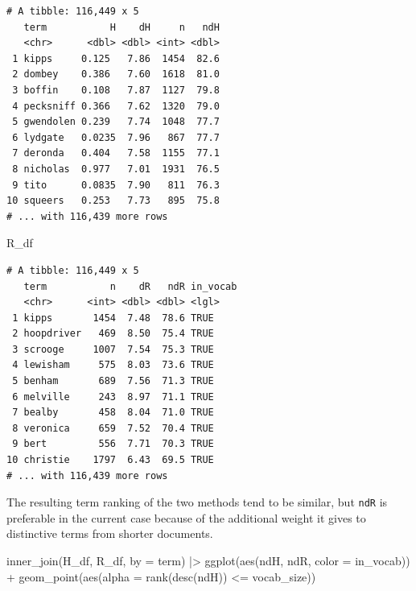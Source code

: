\documentclass[
]{article}
\newenvironment{Shaded}{\begin{snugshade}}{\end{snugshade}}
\newcommand{\AttributeTok}[1]{\textcolor[rgb]{0.40,0.45,0.13}{#1}}
\newcommand{\FunctionTok}[1]{\textcolor[rgb]{0.28,0.35,0.67}{#1}}
\newcommand{\NormalTok}[1]{\textcolor[rgb]{0.00,0.23,0.31}{#1}}
\newcommand{\SpecialCharTok}[1]{\textcolor[rgb]{0.37,0.37,0.37}{#1}}
\newcommand{\StringTok}[1]{\textcolor[rgb]{0.13,0.47,0.30}{#1}}
\begin{document}
\begin{verbatim}
# A tibble: 116,449 x 5
   term           H    dH     n   ndH
   <chr>      <dbl> <dbl> <int> <dbl>
 1 kipps     0.125   7.86  1454  82.6
 2 dombey    0.386   7.60  1618  81.0
 3 boffin    0.108   7.87  1127  79.8
 4 pecksniff 0.366   7.62  1320  79.0
 5 gwendolen 0.239   7.74  1048  77.7
 6 lydgate   0.0235  7.96   867  77.7
 7 deronda   0.404   7.58  1155  77.1
 8 nicholas  0.977   7.01  1931  76.5
 9 tito      0.0835  7.90   811  76.3
10 squeers   0.253   7.73   895  75.8
# ... with 116,439 more rows
\end{verbatim}

\begin{Shaded}
\begin{Highlighting}[]
\NormalTok{R\_df}
\end{Highlighting}
\end{Shaded}

\begin{verbatim}
# A tibble: 116,449 x 5
   term           n    dR   ndR in_vocab
   <chr>      <int> <dbl> <dbl> <lgl>   
 1 kipps       1454  7.48  78.6 TRUE    
 2 hoopdriver   469  8.50  75.4 TRUE    
 3 scrooge     1007  7.54  75.3 TRUE    
 4 lewisham     575  8.03  73.6 TRUE    
 5 benham       689  7.56  71.3 TRUE    
 6 melville     243  8.97  71.1 TRUE    
 7 bealby       458  8.04  71.0 TRUE    
 8 veronica     659  7.52  70.4 TRUE    
 9 bert         556  7.71  70.3 TRUE    
10 christie    1797  6.43  69.5 TRUE    
# ... with 116,439 more rows
\end{verbatim}

The resulting term ranking of the two methods tend to be similar, but
\texttt{ndR} is preferable in the current case because of the additional
weight it gives to distinctive terms from shorter documents.

\begin{Shaded}
\begin{Highlighting}[]
\FunctionTok{inner\_join}\NormalTok{(H\_df, R\_df, }\AttributeTok{by =} \StringTok{\textquotesingle{}term\textquotesingle{}}\NormalTok{) }\SpecialCharTok{|\textgreater{}} 
    \FunctionTok{ggplot}\NormalTok{(}\FunctionTok{aes}\NormalTok{(ndH, ndR, }\AttributeTok{color =}\NormalTok{ in\_vocab)) }\SpecialCharTok{+}
    \FunctionTok{geom\_point}\NormalTok{(}\FunctionTok{aes}\NormalTok{(}\AttributeTok{alpha =} \FunctionTok{rank}\NormalTok{(}\FunctionTok{desc}\NormalTok{(ndH)) }\SpecialCharTok{\textless{}=}\NormalTok{ vocab\_size))}
\end{Highlighting}
\end{Shaded}
\end{document}
